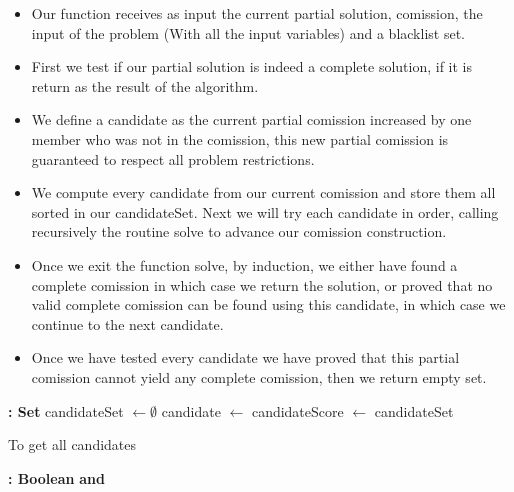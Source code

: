 \documentclass{article}
\begin{document}
\begin{itemize}
  \item Our function receives as input the current partial solution, comission, the input of the problem (With all the input variables) and a blacklist set.
  \item First we test if our partial solution is indeed a complete solution, if it is return as the result of the algorithm.
  \item We define a candidate as the current partial comission increased by one member who was not in the comission, this new partial comission is guaranteed to respect all problem restrictions.
  \item We compute every candidate from our current comission and store them all sorted in our candidateSet. Next we will try each candidate in order, calling recursively the routine solve to advance our comission construction.
  \item Once we exit the function solve, by induction, we either have found a complete comission in which case we return the solution, or proved that no valid complete comission can be found using this candidate, in which case we continue to the next candidate.
  \item Once we have tested every candidate we have proved that this partial comission cannot yield any complete comission, then we return empty set.
\end{itemize}

\begin{algorithm}
\begin{algorithmic}[H]
 \textbf{: Set}
    \State candidateSet $\gets \emptyset$
        \State candidate $\gets$ 
            \State candidateScore $\gets$ 
            \State {}
            \State {}
        \EndIf
    \EndFor
    \State {}
    \State \Return candidateSet
\EndFunction
\end{algorithmic}
\end{algorithm}

To get all candidates 

\begin{algorithm}
\begin{algorithmic}[H]
 \textbf{: Boolean}
    \State \Return {} \textbf{and} 
\EndFunction
\end{algorithmic}
\end{algorithm}
\end{document}
